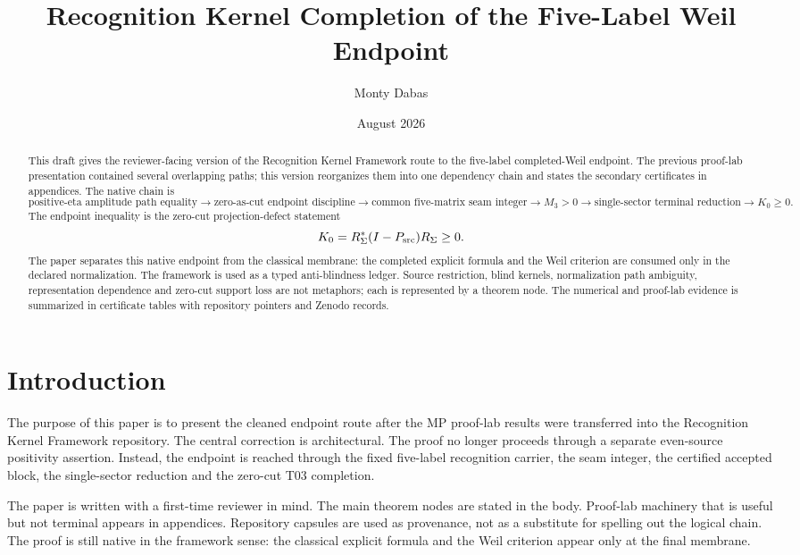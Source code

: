\documentclass[11pt]{article}
\title{Recognition Kernel Completion of the Five-Label Weil Endpoint}
\author{Monty Dabas}
\date{August 2026}
\newcommand{\Psrc}{P_{\rm src}}
\newcommand{\RSigma}{R_\Sigma}
\begin{document}
\maketitle

\begin{abstract}
This draft gives the reviewer-facing version of the Recognition Kernel Framework route to the five-label completed-Weil endpoint.  The previous proof-lab presentation contained several overlapping paths; this version reorganizes them into one dependency chain and states the secondary certificates in appendices.  The native chain is
\[
\text{positive-eta amplitude path equality}
\to
\text{zero-as-cut endpoint discipline}
\to
\text{common five-matrix seam integer}
\to
M_3>0
\to
\text{single-sector terminal reduction}
\to
K_0\ge0.
\]
The endpoint inequality is the zero-cut projection-defect statement
\[
K_0=\RSigma^*(I-\Psrc)\RSigma\ge0.
\]
The paper separates this native endpoint from the classical membrane: the completed explicit formula and the Weil criterion are consumed only in the declared normalization.  The framework is used as a typed anti-blindness ledger.  Source restriction, blind kernels, normalization path ambiguity, representation dependence and zero-cut support loss are not metaphors; each is represented by a theorem node.  The numerical and proof-lab evidence is summarized in certificate tables with repository pointers and Zenodo records.
\end{abstract}

\tableofcontents

\section{Introduction}

The purpose of this paper is to present the cleaned endpoint route after the MP proof-lab results were transferred into the Recognition Kernel Framework repository.  The central correction is architectural.  The proof no longer proceeds through a separate even-source positivity assertion.  Instead, the endpoint is reached through the fixed five-label recognition carrier, the seam integer, the certified accepted block, the single-sector reduction and the zero-cut T03 completion.

The paper is written with a first-time reviewer in mind.  The main theorem nodes are stated in the body.  Proof-lab machinery that is useful but not terminal appears in appendices.  Repository capsules are used as provenance, not as a substitute for spelling out the logical chain.  The proof is still native in the framework sense: the classical explicit formula and the Weil criterion appear only at the final membrane.
\end{document}
